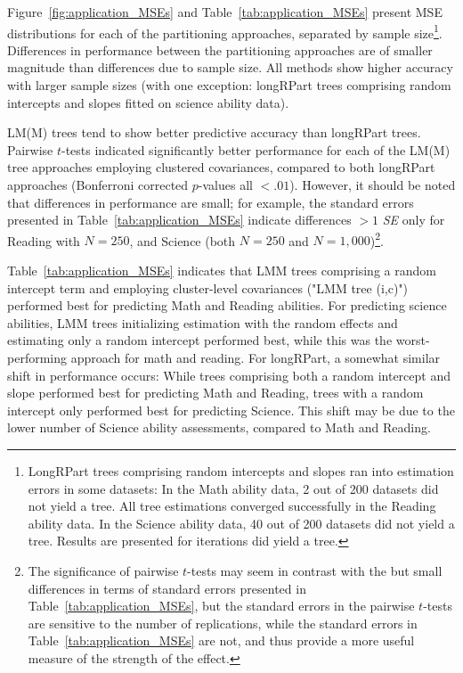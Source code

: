 \documentclass[doc,floatsintext,natbib]{apa7}
\begin{document}
Figure~\ref{fig:application_MSEs} and Table~\ref{tab:application_MSEs} present MSE distributions for each of the partitioning approaches, separated by sample size\footnote{LongRPart trees comprising random intercepts and slopes ran into estimation errors in some datasets: In the Math ability data, 2 out of 200 datasets did not yield a tree. All tree estimations converged successfully in the Reading ability data. In the Science ability data, 40 out of 200 datasets did not yield a tree. Results are presented for iterations did yield a tree.}. Differences in performance between the partitioning approaches are of smaller magnitude than differences due to sample size. All methods show higher accuracy with larger sample sizes (with one exception: longRPart trees comprising random intercepts and slopes fitted on science ability data).

LM(M) trees tend to show better predictive accuracy than longRPart trees. Pairwise $t$-tests indicated significantly better performance for each of the LM(M) tree approaches employing clustered covariances, compared to both longRPart approaches (Bonferroni corrected $p$-values all $< .01$). However, it should be noted that differences in performance are small; for example, the standard errors presented in Table~\ref{tab:application_MSEs} indicate differences $> 1$ \textit{SE} only for Reading with $N=250$, and Science (both $N=250$ and $N=1,000$)\footnote{The significance of pairwise $t$-tests may seem in contrast with the but small differences in terms of standard errors presented in Table~\ref{tab:application_MSEs}, but the standard errors in the pairwise $t$-tests are sensitive to the number of replications, while the standard errors in Table~\ref{tab:application_MSEs} are not, and thus provide a more useful measure of the strength of the effect.}. 

Table~\ref{tab:application_MSEs} indicates that LMM trees comprising a random intercept term and employing cluster-level covariances ("LMM tree (i,c)") performed best for predicting Math and Reading abilities. For predicting science abilities, LMM trees initializing estimation with the random effects and estimating only a random intercept performed best, while this was the worst-performing approach for math and reading. For longRPart, a somewhat similar shift in performance occurs: While trees comprising both a random intercept and slope performed best for predicting Math and Reading, trees with a random intercept only performed best for predicting Science. This shift may be due to the lower number of Science ability assessments, compared to Math and Reading.
\end{document}
